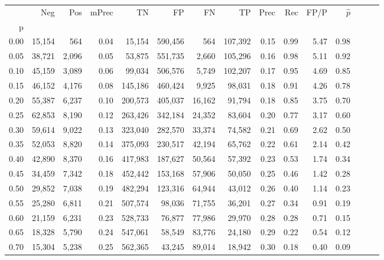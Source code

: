\begin{tabular}{rrrrrrrrrrrrrrr}
\toprule
{} &     Neg &    Pos & mPrec &       TN &       FP &       FN &       TP &  Prec &   Rec &  FP/P & $\hat{p}$ \\
p    &         &        &       &          &          &          &          &       &       &       &           \\
\midrule
0.00 &  15,154 &    564 &  0.04 &   15,154 &  590,456 &      564 &  107,392 &  0.15 &  0.99 &  5.47 &      0.98 \\
0.05 &  38,721 &  2,096 &  0.05 &   53,875 &  551,735 &    2,660 &  105,296 &  0.16 &  0.98 &  5.11 &      0.92 \\
0.10 &  45,159 &  3,089 &  0.06 &   99,034 &  506,576 &    5,749 &  102,207 &  0.17 &  0.95 &  4.69 &      0.85 \\
0.15 &  46,152 &  4,176 &  0.08 &  145,186 &  460,424 &    9,925 &   98,031 &  0.18 &  0.91 &  4.26 &      0.78 \\
0.20 &  55,387 &  6,237 &  0.10 &  200,573 &  405,037 &   16,162 &   91,794 &  0.18 &  0.85 &  3.75 &      0.70 \\
0.25 &  62,853 &  8,190 &  0.12 &  263,426 &  342,184 &   24,352 &   83,604 &  0.20 &  0.77 &  3.17 &      0.60 \\
0.30 &  59,614 &  9,022 &  0.13 &  323,040 &  282,570 &   33,374 &   74,582 &  0.21 &  0.69 &  2.62 &      0.50 \\
0.35 &  52,053 &  8,820 &  0.14 &  375,093 &  230,517 &   42,194 &   65,762 &  0.22 &  0.61 &  2.14 &      0.42 \\
0.40 &  42,890 &  8,370 &  0.16 &  417,983 &  187,627 &   50,564 &   57,392 &  0.23 &  0.53 &  1.74 &      0.34 \\
0.45 &  34,459 &  7,342 &  0.18 &  452,442 &  153,168 &   57,906 &   50,050 &  0.25 &  0.46 &  1.42 &      0.28 \\
0.50 &  29,852 &  7,038 &  0.19 &  482,294 &  123,316 &   64,944 &   43,012 &  0.26 &  0.40 &  1.14 &      0.23 \\
0.55 &  25,280 &  6,811 &  0.21 &  507,574 &   98,036 &   71,755 &   36,201 &  0.27 &  0.34 &  0.91 &      0.19 \\
0.60 &  21,159 &  6,231 &  0.23 &  528,733 &   76,877 &   77,986 &   29,970 &  0.28 &  0.28 &  0.71 &      0.15 \\
0.65 &  18,328 &  5,790 &  0.24 &  547,061 &   58,549 &   83,776 &   24,180 &  0.29 &  0.22 &  0.54 &      0.12 \\
0.70 &  15,304 &  5,238 &  0.25 &  562,365 &   43,245 &   89,014 &   18,942 &  0.30 &  0.18 &  0.40 &      0.09 \\

\end{tabular}
